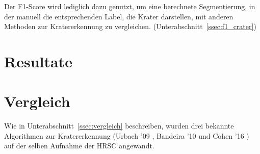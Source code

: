 Der F1-Score wird lediglich dazu genutzt, um eine berechnete Segmentierung, in der manuell die entsprechenden Label, die Krater darstellen, mit anderen Methoden zur Kratererkennung zu vergleichen. (\vgl Unterabschnitt~\ref{ssec:f1_crater})

\section{Resultate}
\label{sec:resultate}

\section{Vergleich}
\label{sec:vergleich}

Wie in Unterabschnitt~\ref{ssec:vergleich} beschreiben, wurden drei bekannte Algorithmen zur Kratererkennung  (Urbach '09 \cite{urbach_stepinski_2009}, Bandeira '10 \cite{bandeira_10} und Cohen '16 \cite{cohen_16}) auf der selben Aufnahme der HRSC angewandt.

